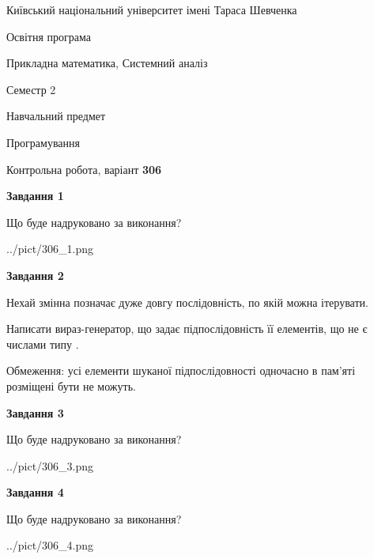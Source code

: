 \documentclass[12pt, ukrainian]{article}
\begin{document}
{{\begin {small}\par
{ \center  Київський національний університет імені Тараса Шевченка \par}
{\parbox {5 cm}{Освітня програма \hfill}{\parbox {8 cm}{Прикладна математика, Системний аналіз \hfill}}\parbox {5 cm}{\hfill Семестр 2}}\par
{\parbox {5 cm} {Навчальний предмет \hfill}\parbox {7 cm}{Програмування \hfill}\parbox {6cm}{\hfill}\par}\vspace{-7pt} \end{small}}{\center Контрольна робота, варіант  \No \textbf
{ 306 }\par}}
{
\begin {large}
{\begin {center}\textbf{Завдання 1}\end {center}}\par
Що буде надруковано за виконання?\par\par
\begin{center}
	{../pict/306_1.png}
\end{center}
\newpage

{\begin {center}\textbf{Завдання 2}\end {center}}\par
Нехай змінна  позначає дуже довгу послідовність, по якій можна ітерувати.

Написати вираз-генератор, що задає підпослідовність її елементів, що не є числами типу .

Обмеження: усі елементи шуканої підпослідовності одночасно в пам'яті розміщені бути не можуть.\par
\newpage

{\begin {center}\textbf{Завдання 3}\end {center}}\par
Що буде надруковано за виконання?\par
\begin{center}
	{../pict/306_3.png}
\end{center}
\newpage

{\begin {center}\textbf{Завдання 4}\end {center}}\par
Що буде надруковано за виконання?\par
\begin{center}
	{../pict/306_4.png}
\end{center}
\newpage


\end{large}}
\end{document}
